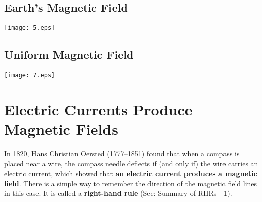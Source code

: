 \documentclass{elegantpaper}
\begin{document}
\begin{multicols}{3}
\subsection{Earth’s Magnetic Field}
\begin{minipage}{\linewidth}
  \vspace{0.5cm}
  \setlength{\abovecaptionskip}{0.2cm}
  \setlength{\belowcaptionskip}{0.3cm}
  \centering
  \texttt{[image: 5.eps]}
  \label{fig:20-5}
\end{minipage}
\subsection{Uniform Magnetic Field}
\begin{minipage}{\linewidth}
  \vspace{0.5cm}
  \setlength{\abovecaptionskip}{0.2cm}
  \setlength{\belowcaptionskip}{0.3cm}
  \centering
  \texttt{[image: 7.eps]}
  \label{fig:20-7}
\end{minipage}
\section{Electric Currents Produce Magnetic Fields}
In 1820, Hans Christian Oersted (1777–1851) found that when a compass is placed near a wire, the compass needle deflects if (and only if) the wire carries an electric current, which showed that \textbf{an electric current produces a magnetic field}. There is a simple way to remember the direction of the magnetic field lines in this case. It is called a \textbf{right-hand rule} (See: Summary of RHRs - 1).

\end{multicols}
\end{document}
